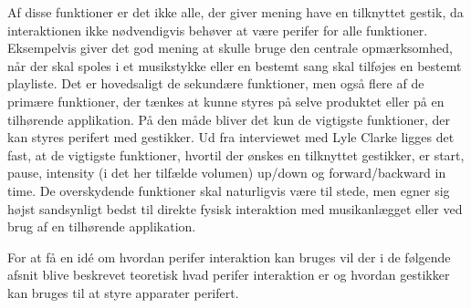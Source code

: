 Af disse funktioner er det ikke alle, der giver mening have en tilknyttet gestik, da interaktionen ikke nødvendigvis behøver at være perifer for alle funktioner. Eksempelvis giver det god mening at skulle bruge den centrale opmærksomhed, når der skal spoles i et musikstykke eller en bestemt sang skal tilføjes en bestemt playliste. Det er hovedsaligt de sekundære funktioner, men også flere af de primære funktioner, der tænkes at kunne styres på selve produktet eller på en tilhørende applikation. På den måde bliver det kun de vigtigste funktioner, der kan styres perifert med gestikker. Ud fra interviewet med Lyle Clarke ligges det fast, at de vigtigste funktioner, hvortil der ønskes en tilknyttet gestikker, er start, pause, intensity (i det her tilfælde volumen) up/down og forward/backward in time. De overskydende funktioner skal naturligvis være til stede, men egner sig højst sandsynligt bedst til direkte fysisk interaktion med musikanlægget eller ved brug af en tilhørende applikation.

For at få en idé om hvordan perifer interaktion kan bruges vil der i de følgende afsnit blive beskrevet teoretisk hvad perifer interaktion er og hvordan gestikker kan bruges til at styre apparater perifert. 

